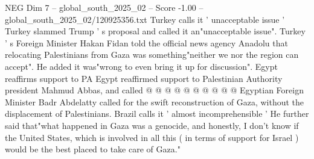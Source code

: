 \begin{textsample}{NEG Dim 7 – global\_south\_2025\_02 – Score -1.00 – global\_south\_2025\_02/120925356.txt}
Turkey calls it ' unacceptable issue ' Turkey slammed Trump ' s proposal and called it an"unacceptable issue".
Turkey ' s Foreign Minister Hakan Fidan told the official news agency Anadolu that relocating Palestinians from Gaza was something"neither we nor the region can accept".
He added it was"wrong to even bring it up for discussion".
Egypt reaffirms support to PA Egypt reaffirmed support to Palestinian Authority president Mahmud Abbas, and called @ @ @ @ @ @ @ @ @ @ Egyptian Foreign Minister Badr Abdelatty called for the swift reconstruction of Gaza, without the displacement of Palestinians.
Brazil calls it ' almost incomprehensible ' He further said that"what happened in Gaza was a genocide, and honestly, I don't know if the United States, which is involved in all this ( in terms of support for Israel ) would be the best placed to take care of Gaza."

\end{textsample}
